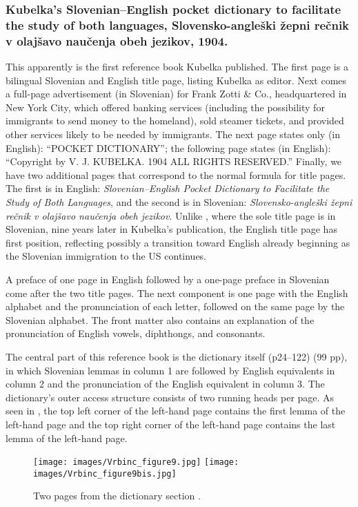 \documentclass[output=paper,colorlinks,citecolor=brown,arabicfont,chinesefont]{langscibook}
\begin{document}
\subsubsection{Kubelka’s Slovenian–English pocket dictionary to facilitate the study of both languages, Slovensko-angleški žepni rečnik v olajšavo naučenja obeh jezikov, 1904.}

This apparently is the first reference book Kubelka published. The first page is a bilingual Slovenian and English title page, listing Kubelka as editor. Next comes a full-page advertisement (in Slovenian) for Frank Zotti \& Co., headquartered in New York City, which offered banking services (including the possibility for immigrants to send money to the homeland), sold steamer tickets, and provided other services likely to be needed by immigrants. The next page states only (in English): “POCKET DICTIONARY”; the following page states (in English): “Copyright by V. J. KUBELKA. 1904 ALL RIGHTS RESERVED.” Finally, we have two additional pages that correspond to the normal formula for title pages. The first is in English: \emph{Slovenian–English Pocket Dictionary to Facilitate the Study of Both Languages}, and the second is in Slovenian: \emph{Slovensko-angleški žepni rečnik v olajšavo naučenja obeh jezikov}. Unlike \citet{Jeram1895}, where the sole title page is in Slovenian, nine years later in Kubelka’s publication, the English title page has first position, reflecting possibly a transition toward English already beginning as the Slovenian immigration to the US continues.

A preface of one page in English followed by a one-page preface in Slovenian come after the two title pages. The next component is one page with the English alphabet and the pronunciation of each letter, followed on the same page by the Slovenian alphabet. The front matter also contains an explanation of the pronunciation of English vowels, diphthongs, and consonants. 

The central part of this reference book is the dictionary itself (p24–122) (99 pp), in which Slovenian lemmas in column 1 are followed by English equivalents in column 2 and the pronunciation of the English equivalent in column 3. The dictionary’s outer access structure consists of two running heads per page. As seen in , the top left corner of the left-hand page contains the first lemma of the left-hand page and the top right corner of the left-hand page contains the last lemma of the left-hand page. 

\begin{sidewaysfigure}
\texttt{[image: images/Vrbinc\_figure9.jpg]}\hfill
\texttt{[image: images/Vrbinc\_figure9bis.jpg]}
\caption{Two pages from the dictionary section \citep[24,36]{Kubelka1904}.}
\label{vrbinc:fig9}
\end{sidewaysfigure}
\end{document}

